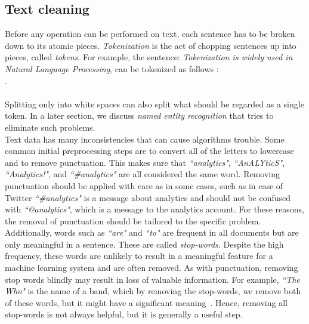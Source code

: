 \subsection{Text cleaning }
Before any operation can be performed on text, each sentence has to be broken down to its atomic pieces. \emph{Tokenization} is the act of chopping sentences up into pieces, called \emph{tokens}.  For example, the sentence: \emph{Tokenization is widely used in Natural Language Processing}, can be tokenized as follows : \\

     .\\
\\
Splitting only into white spaces can also split what should be regarded as a single token. In a later section, we discuss \emph{named entity recognition} that tries to eliminate such problems.  \\
\noindent
Text data has many inconsistencies that can cause algorithms trouble. Some common initial preprocessing steps are to convert all of the letters to lowercase and to remove punctuation. 
This makes sure that \emph{``analytics"}, \emph{``AnALYticS"}, \emph{``Analytics!"}, and \emph{``\#analytics"} are all considered the same word. Removing punctuation should be applied with care as in some cases, such as in case of Twitter \emph{``\#analytics"} is a message about analytics and should not be confused with \emph{``@analytics"}, which is a message to the analytics account. For these reasons, the removal of punctuation should be tailored to the specific problem.\\
Additionally, words such as \emph{``are"} and \emph{``to"} are frequent in all documents but are only meaningful in a sentence. These are called \emph{stop-words}. Despite the high frequency, these words are unlikely to result in a meaningful feature for a machine learning system and are often removed. As with punctuation, removing stop words blindly may result in loss of valuable information. For example, \emph{``The Who"} is the name of a band, which by removing the stop-words, we remove both of these words, but it might have a significant meaning~. Hence, removing all stop-words is not always helpful, but it is generally a useful step. 

